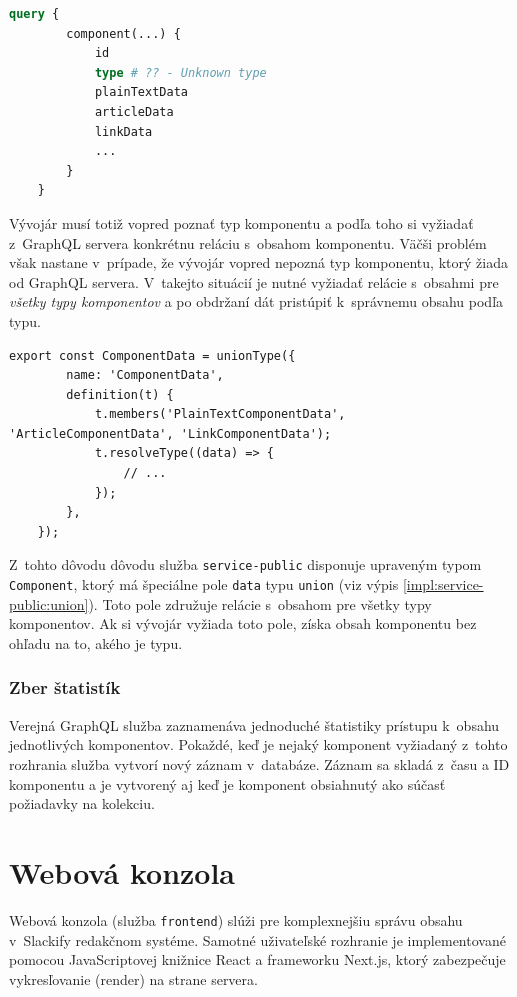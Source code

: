 \begin{lstlisting}[language={GraphQL}, caption={Príklad získania obsahu komponentu pred optimalizáciou.}]
	query {
		component(...) {
			id
			type # ?? - Unknown type
			plainTextData
			articleData
			linkData
			...
		}
	}
\end{lstlisting}

\medskip

\noindent Vývojár musí totiž vopred poznať typ komponentu a podľa toho si vyžiadať z~GraphQL servera konkrétnu reláciu s~obsahom komponentu. Väčši problém však nastane v~prípade, že vývojár vopred nepozná typ komponentu, ktorý žiada od GraphQL servera. V~takejto situácií je nutné vyžiadať relácie s~obsahmi pre \emph{všetky typy komponentov} a po obdržaní dát pristúpiť k~správnemu obsahu podľa typu. \\

\begin{lstlisting}[caption={Definícia union typu pre dáta komponentu.}, label={impl:service-public:union}]
	export const ComponentData = unionType({
		name: 'ComponentData',
		definition(t) {
			t.members('PlainTextComponentData', 'ArticleComponentData', 'LinkComponentData');
			t.resolveType((data) => {
				// ...
			});
		},
	});
\end{lstlisting}

\medskip

\noindent Z~tohto dôvodu dôvodu služba \texttt{service-public} disponuje upraveným typom \texttt{Component}, ktorý má špeciálne pole \texttt{data} typu \texttt{union} (viz výpis \ref{impl:service-public:union}). Toto pole združuje relácie s~obsahom pre všetky typy komponentov. Ak si vývojár vyžiada toto pole, získa obsah komponentu bez ohľadu na to, akého je typu.

\subsubsection{Zber štatistík}
Verejná GraphQL služba zaznamenáva jednoduché štatistiky prístupu k~obsahu jednotlivých komponentov. Pokaždé, keď je nejaký komponent vyžiadaný z~tohto rozhrania služba vytvorí nový záznam v~databáze. Záznam sa skladá z~času a ID komponentu a je vytvorený aj keď je komponent obsiahnutý ako súčasť požiadavky na kolekciu.

\section{Webová konzola}
\label{impl:frontend}
Webová konzola (služba \texttt{frontend}) slúži pre komplexnejšiu správu obsahu v~Slackify redakčnom systéme. Samotné uživateľské rozhranie je implementované pomocou JavaScriptovej knižnice React a frameworku Next.js, ktorý zabezpečuje vykresľovanie (render) na strane servera.

